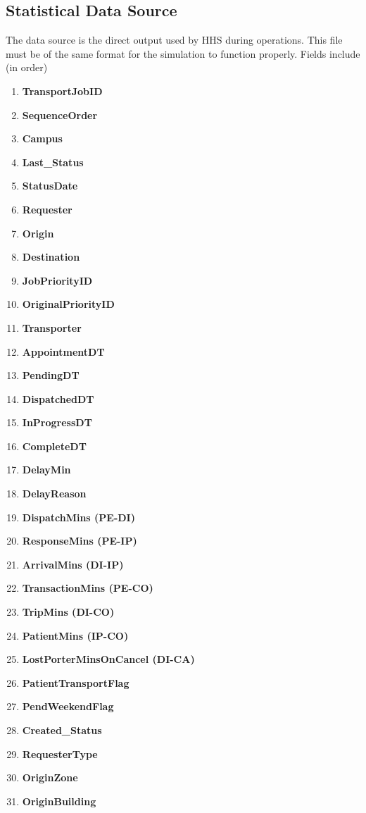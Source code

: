 \documentclass[paper=letter, fontsize=10pt]{scrartcl}
\numberwithin{equation}{section}		%
\numberwithin{figure}{section}			%
\numberwithin{table}{section}				%
\begin{document}
	\subsection{Statistical Data Source}
	The data source is the direct output used by HHS during operations. This file must be of the same format for the simulation to function properly. Fields include (in order)
	\begin{enumerate}
	\item \textbf{TransportJobID}
	\item \textbf{SequenceOrder}
	\item \textbf{Campus}
	\item \textbf{Last\_Status}
	\item \textbf{StatusDate}
	\item \textbf{Requester}
	\item \textbf{Origin}
	\item \textbf{Destination}
	\item \textbf{JobPriorityID}
	\item \textbf{OriginalPriorityID}
	\item \textbf{Transporter}
	\item \textbf{AppointmentDT}
	\item \textbf{PendingDT}
	\item \textbf{DispatchedDT}
	\item \textbf{InProgressDT}
	\item \textbf{CompleteDT}
	\item \textbf{DelayMin}
	\item \textbf{DelayReason}
	\item \textbf{DispatchMins (PE-DI)}
	\item \textbf{ResponseMins (PE-IP)}
	\item \textbf{ArrivalMins (DI-IP)}
	\item \textbf{TransactionMins (PE-CO)}
	\item \textbf{TripMins (DI-CO)}
	\item \textbf{PatientMins (IP-CO)}
	\item \textbf{LostPorterMinsOnCancel (DI-CA)}
	\item \textbf{PatientTransportFlag}
	\item \textbf{PendWeekendFlag}
	\item \textbf{Created\_Status}
	\item \textbf{RequesterType}
	\item \textbf{OriginZone}
	\item \textbf{OriginBuilding}

\end{enumerate}
\end{document}
